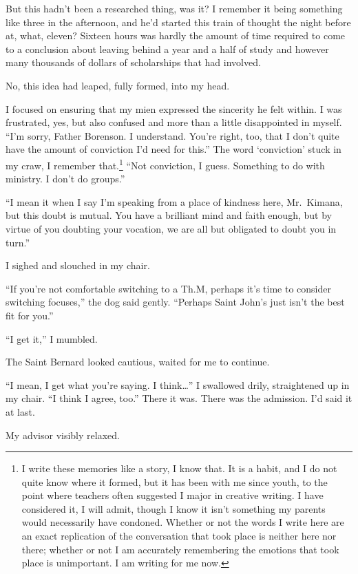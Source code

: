 But this hadn't been a researched thing, was it? I remember it being something like three in the afternoon, and he'd started this train of thought the night before at, what, eleven? Sixteen hours was hardly the amount of time required to come to a conclusion about leaving behind a year and a half of study and however many thousands of dollars of scholarships that had involved.

No, this idea had leaped, fully formed, into my head.

I focused on ensuring that my mien expressed the sincerity he felt within. I was frustrated, yes, but also confused and more than a little disappointed in myself. ``I'm sorry, Father Borenson. I understand. You're right, too, that I don't quite have the amount of conviction I'd need for this.'' The word `conviction' stuck in my craw, I remember that.\footnote{I write these memories like a story, I know that. It is a habit, and I do not quite know where it formed, but it has been with me since youth, to the point where teachers often suggested I major in creative writing. I have considered it, I will admit, though I know it isn't something my parents would necessarily have condoned. Whether or not the words I write here are an exact replication of the conversation that took place is neither here nor there; whether or not I am accurately remembering the emotions that took place is unimportant. I am writing for me now.} ``Not conviction, I guess. Something to do with ministry. I don't do groups.''

``I mean it when I say I'm speaking from a place of kindness here, Mr.~Kimana, but this doubt is mutual. You have a brilliant mind and faith enough, but by virtue of you doubting your vocation, we are all but obligated to doubt you in turn.''

I sighed and slouched in my chair.

``If you're not comfortable switching to a Th.M, perhaps it's time to consider switching focuses,'' the dog said gently. ``Perhaps Saint John's just isn't the best fit for you.''

``I get it,'' I mumbled.

The Saint Bernard looked cautious, waited for me to continue.

``I mean, I get what you're saying. I think\ldots{}'' I swallowed drily, straightened up in my chair. ``I think I agree, too.'' There it was. There was the admission. I'd said it at last.

My advisor visibly relaxed.

